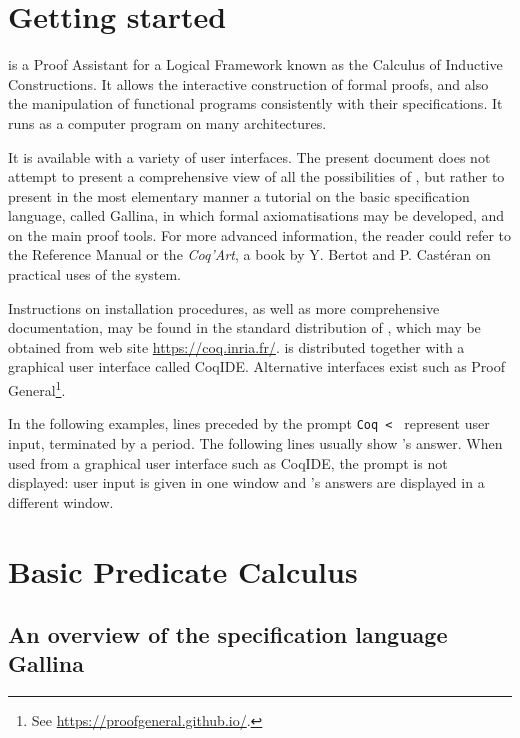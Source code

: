 \documentclass[11pt,a4paper]{book}
\begin{document}


\chapter*{Getting started}

\Coq{} is a Proof Assistant for a Logical Framework known as the Calculus
of Inductive Constructions. It allows the interactive construction of
formal proofs, and also the manipulation of functional programs 
consistently with their specifications. It runs as a computer program
on many architectures.

It is available with a variety of user interfaces. The present
document does not attempt to present a comprehensive view of all the
possibilities of \Coq, but rather to present in the most elementary
manner a tutorial on the basic specification language, called Gallina,
in which formal axiomatisations may be developed, and on the main
proof tools.  For more advanced information, the reader could refer to
the \Coq{} Reference Manual or the \textit{Coq'Art}, a book by Y.
Bertot and P. Castéran on practical uses of the \Coq{} system.

Instructions on installation procedures, as well as more comprehensive
documentation, may be found in the standard distribution of \Coq,
which may be obtained from \Coq{} web site \url{https://coq.inria.fr/}.
\Coq{} is distributed together with a graphical user interface called
CoqIDE. Alternative interfaces exist such as
Proof General\footnote{See \url{https://proofgeneral.github.io/}.}.

In the following examples, lines preceded by the prompt \verb:Coq < :
represent user input, terminated by a period.
The following lines usually show \Coq's answer.
When used from a graphical user interface such as
CoqIDE, the prompt is not displayed: user input is given in one window
and \Coq's answers are displayed in a different window.

\chapter{Basic Predicate Calculus}

\section{An overview of the specification language Gallina}
\end{document}
